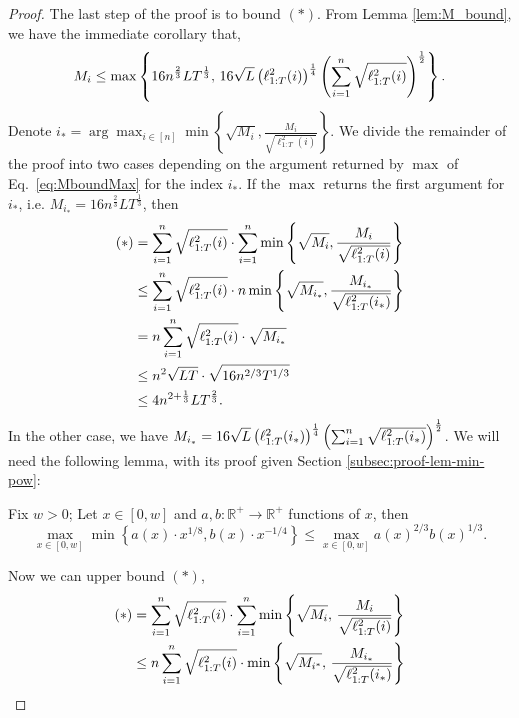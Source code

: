 \begin{proof}
The last step of the proof is to bound $(*)$. From Lemma \ref{lem:M_bound}, we have the immediate corollary that,
\begin{equation}\label{eq:MboundMax}
M_i \leq \max \left\{ 16n^{\frac{2}{3}}LT^{\frac{1}{3}}, \, 16\sqrt{L}  \left(\ell_{1:T}^2(i)\right) ^{\frac{1}{4}} \left( \sum_{i=1}^n \sqrt{\ell_{1:T}^2(i)}\right)^{\frac{1}{2}} \right\}.
\end{equation}
Denote $i_* = \arg \max_{i \in [n]} \min\left\{ \sqrt{M_i} , \frac{M_i}{\sqrt{\ell_{1:T}^2(i)}} \right\}$.
We divide the remainder of the proof into two cases depending on the argument returned by $\max$ of Eq.~\eqref{eq:MboundMax} for the index $i_*$.
If the $\max$ returns the first argument for $i_*$, i.e. $M_{i_*} = 16n^{\frac{2}{3}}LT^{\frac{1}{3}}$, then
\begin{align}\label{eq:exp-regret-1st-term-a}
 (*) &= \sum_{i=1}^n \sqrt{\ell_{1:T}^2(i)} 
 \cdot \sum_{i=1}^n \min\left\{ \sqrt{M_i} , \frac{M_{i}}{\sqrt{\ell_{1:T}^2(i)}} \right\} \nonumber\\
 & \leq \sum_{i=1}^n \sqrt{\ell_{1:T}^2(i)} 
 \cdot  n \min\left\{ \sqrt{M_{i_*}} , \frac{M_{i_*}}{\sqrt{\ell_{1:T}^2(i_*)}} \right\}  \nonumber\\
 &= 
n \sum_{i=1}^n \sqrt{\ell_{1:T}^2(i)} 
 \cdot   \sqrt{M_{i_*}}  \nonumber\\
 &\leq
 n^2\sqrt{LT} \cdot\sqrt{ 16n^{2/3}T^{1/3}} \nonumber\\
 &\leq
 4 n^{2+\frac{1}{3}}L T^\frac{2}{3}.
 \end{align}
In the other case, we have $M_{i_*} = 16\sqrt{L}  \left(\ell_{1:T}^2(i_*)\right) ^{\frac{1}{4}} \left( \sum_{i=1}^n \sqrt{\ell_{1:T}^2(i_*)}\right)^{\frac{1}{2}}$. We will need the following lemma, with its proof given Section \ref{subsec:proof-lem-min-pow}:
\begin{lemma}\label{lemma:min-pow}
Fix $w>0$; Let $x\in [0,w]$ and $a,b:\mathbb{R}^+ \rightarrow \mathbb{R}^+ $ functions of $x$,  then
$$
\max_{x\in[0,w]} \min \left\{a(x) \cdot x^{1/8}, b(x) \cdot  x^{-1/4} \right\} \leq \max_{x\in[0,w]} a(x)^{2/3} b(x)^{1/3}.
$$
\end{lemma}
Now we can upper bound $(*)$,
\begin{align}\label{eq:exp-regret-1st-term-b}
 (*) &= \sumin \sqrt{\ell_{1:T}^2(i)} 
 \cdot \sumin \min\left\{ \sqrt{M_i} ,\, \frac{M_i}{\sqrt{\ell_{1:T}^2(i)}} \right\} \nonumber\\
 & \leq n\sumin \sqrt{\ell_{1:T}^2(i)} 
 \cdot   \min\left\{ \sqrt{M_{i^*}} ,\, \frac{M_{i_*}}{\sqrt{\ell_{1:T}^2(i_*)}} \right\}  \nonumber\\

\end{align}
\end{proof}

